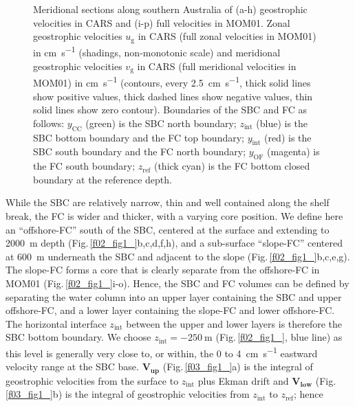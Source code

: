 \documentclass[preprint,3p,review,12pt]{elsarticle}
\renewcommand{\Vec}[1]{\mathbf{#1}}
\newcommand{\sub}[1]{_{\text{#1}}}
\begin{document}
\begin{figure}[p]
{  Meridional sections along southern Australia of (a-h) geostrophic velocities in CARS and (i-p) full velocities in MOM01. Zonal geostrophic velocities $u\sub{g}$ in CARS (full zonal velocities in MOM01) in \si{\centi\meter\per\second} (shadings, non-monotonic scale) and meridional geostrophic velocities $v\sub{g}$ in CARS (full meridional velocities in MOM01) in \si{\centi\meter\per\second} (contours, every \SI{2.5}{\centi\meter\per\second}, thick solid lines show positive values, thick dashed lines show negative values, thin solid lines show zero contour). Boundaries of the SBC and FC as follows: $y\sub{CC}$ (green) is the SBC north boundary; $z\sub{int}$ (blue) is the SBC bottom boundary and the FC top boundary; $y\sub{int}$ (red) is the SBC south boundary and the FC north boundary; $y\sub{OF}$ (magenta) is the FC south boundary; $z\sub{ref}$ (thick cyan) is the FC bottom closed boundary at the reference depth.}
\end{figure}

While the SBC are relatively narrow, thin and well contained along the shelf break, the FC is wider and thicker, with a varying core position. We define here an \enquote{offshore-FC}
south of the SBC, centered at the surface and extending to \SI{2000}{\meter} depth (Fig.\,\ref{f02_fig1_}b,c,d,f,h), and
a sub-surface \enquote{slope-FC} centered at \SI{600}{\meter} underneath the SBC and adjacent to the slope (Fig.\,\ref{f02_fig1_}b,c,e,g). The slope-FC forms a core that is clearly separate from the offshore-FC in MOM01 (Fig.\,\ref{f02_fig1_}i-o).
Hence, the SBC and FC volumes can be defined by separating the water column into an upper layer containing the SBC and upper offshore-FC, and a lower layer containing the slope-FC and lower offshore-FC\@. The horizontal interface $z\sub{int}$ between the upper and lower layers is therefore the SBC bottom boundary. We choose $z\sub{int} = \SI{-250}{\meter}$ (Fig.\,\ref{f02_fig1_}, blue line) as this level is generally very close to, or within, the \num{0} to \SI{4}{\centi\meter\per\second} eastward velocity range at the SBC base. $\Vec{V\sub{up}}$ (Fig.\,\ref{f03_fig1_}a) is the integral of geostrophic velocities from the surface to $z\sub{int}$ plus Ekman drift and $\Vec{V\sub{low}}$ (Fig.\,\ref{f03_fig1_}b) is the integral of geostrophic velocities from $z\sub{int}$ to $z\sub{ref}$; hence
\end{document}
